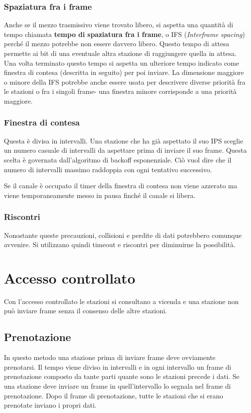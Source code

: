         \subsubsection{Spaziatura fra i frame}
            Anche se il mezzo trasmissivo viene trovato libero, si aspetta una quantità di tempo chiamata \textbf{tempo di spaziatura fra i frame}, o IFS (\textit{Interframe spacing}) perché il mezzo potrebbe non essere davvero libero. Questo tempo di attesa permette ai bit di una eventuale altra stazione di raggiungere quella in attesa. Una volta terminato questo tempo si aspetta un ulteriore tempo indicato come finestra di contesa (descritta in seguito) per poi inviare. La dimensione maggiore o minore della IFS potrebbe anche essere usata per descrivere diverse priorità fra le stazioni o fra i singoli frame- una finestra minore corrisponde a una priorità maggiore.
            
        \subsubsection{Finestra di contesa}
            Questa è divisa in intervalli. Una stazione che ha già aspettato il suo IPS sceglie un numero casuale di intervalli da aspettare prima di inviare il suo frame. Questa scelta è governata dall'algoritmo di backoff esponenziale. Ciò vuol dire che il numero di intervalli massimo raddoppia con ogni tentativo successivo.
            
            Se il canale è occupato il timer della finestra di contesa non viene azzerato ma viene temporaneamente messo in pausa finché il canale si libera.
            
        \subsubsection{Riscontri}
            Nonostante queste precauzioni, collisioni e perdite di dati potrebbero comunque avvenire. Si utilizzano quindi timeout e riscontri per diminuirne la possibilità.
            
\section{Accesso controllato}
    Con l'accesso controllato le stazioni si consultano a vicenda e una stazione non può inviare frame senza il consenso delle altre stazioni.
    
    \subsection{Prenotazione}
        In questo metodo una stazione prima di inviare frame deve ovviamente prenotarsi. Il tempo viene diviso in intervalli e in ogni intervallo un frame di prenotazione composto da tante parti quante sono le stazioni precede i dati. Se una stazione deve inviare un frame in quell'intervallo lo segnala nel frame di prenotazione. Dopo il frame di prenotazione, tutte le stazioni che si erano prenotate inviano i propri dati. 
